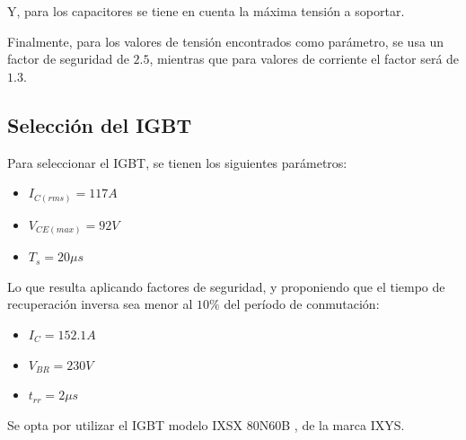 Y, para los capacitores se tiene en cuenta la máxima tensión a soportar.

Finalmente, para los valores de tensión encontrados como parámetro, se usa un factor de seguridad de $2.5$, mientras que para valores de corriente el factor será de $1.3$.

\subsection{Selección del IGBT}

Para seleccionar el IGBT, se tienen los siguientes parámetros:

\begin{itemize}
	\item $I_{C(rms)}=117 A$
	\item $V_{CE(max)} = 92 V$
	\item $T_s=20\mu s$
\end{itemize}

Lo que resulta aplicando factores de seguridad, y proponiendo que el tiempo de recuperación inversa sea menor al $10\%$ del período de conmutación:

\begin{itemize}
	\item $I_C=152.1A$
	\item $V_{BR} = 230V$
	\item $t_{rr} = 2 \mu s$
\end{itemize}

Se opta por utilizar el IGBT modelo IXSX 80N60B , de la marca IXYS. 

